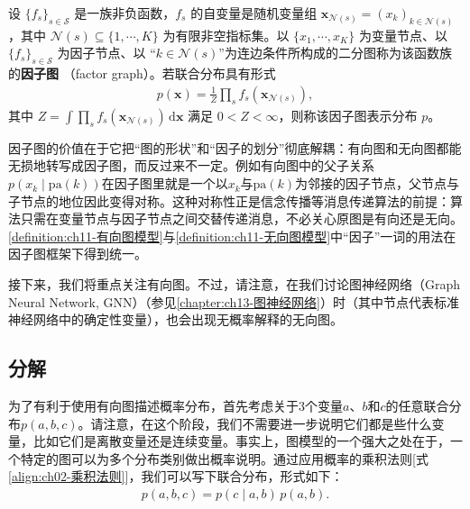 \documentclass[../../main.tex]{subfiles}
\begin{document}
\begin{definition}[因子图]\label{definition:ch11-因子图}
设 $\{f_s\}_{s\in\mathcal{S}}$ 是一族非负函数，$f_s$ 的自变量是随机变量组
$\mathbf{x}_{\mathcal{N}(s)}=(x_k)_{k\in\mathcal{N}(s)}$，其中
$\mathcal{N}(s)\subseteq\{1,\cdots,K\}$ 为有限非空指标集。以
$\{x_1,\cdots,x_K\}$ 为变量节点、以 $\{f_s\}_{s\in\mathcal{S}}$ 为因子节点、以
“$k\in\mathcal{N}(s)$”为连边条件所构成的二分图称为该函数族的\textbf{因子图}
（factor graph）。若联合分布具有形式
\begin{align}
  p(\mathbf{x}) = \frac{1}{Z}\prod_{s}f_s(\mathbf{x}_{\mathcal{N}(s)}),
  \label{align:ch11-因子图分解}
\end{align}
其中 $Z=\int\prod_{s}f_s(\mathbf{x}_{\mathcal{N}(s)})\,\mathrm{d}\mathbf{x}$ 满足
$0<Z<\infty$，则称该因子图表示分布 $p$。
\end{definition}

\begin{remark}
因子图的价值在于它把“图的形状”和“因子的划分”彻底解耦：有向图和无向图都能无损地转写成因子图，而反过来不一定。例如有向图中的父子关系$p(x_k\mid \mathrm{pa}(k))$在因子图里就是一个以$x_k$与$\mathrm{pa}(k)$为邻接的因子节点，父节点与子节点的地位因此变得对称。这种对称性正是信念传播等消息传递算法的前提：算法只需在变量节点与因子节点之间交替传递消息，不必关心原图是有向还是无向。\cref{definition:ch11-有向图模型}与\cref{definition:ch11-无向图模型}中“因子”一词的用法在因子图框架下得到统一。
\end{remark}

接下来，我们将重点关注有向图。不过，请注意，在我们讨论图神经网络（Graph Neural Network, GNN）（参见\cref{chapter:ch13-图神经网络}）时（其中节点代表标准神经网络中的确定性变量），也会出现无概率解释的无向图。

\subsection{分解}\label{subsection:ch11-分解}

为了有利于使用有向图描述概率分布，首先考虑关于3个变量$a$、$b$和$c$的任意联合分布$p(a,b,c)$。请注意，在这个阶段，我们不需要进一步说明它们都是些什么变量，比如它们是离散变量还是连续变量。事实上，图模型的一个强大之处在于，一个特定的图可以为多个分布类别做出概率说明。通过应用概率的乘积法则[式\eqref{align:ch02-乘积法则}]，我们可以写下联合分布，形式如下：
\begin{align}
  p(a,b,c) = p(c\mid a,b)\,p(a,b).
  \label{align:ch11-三变量分解1}
\end{align}
\end{document}
